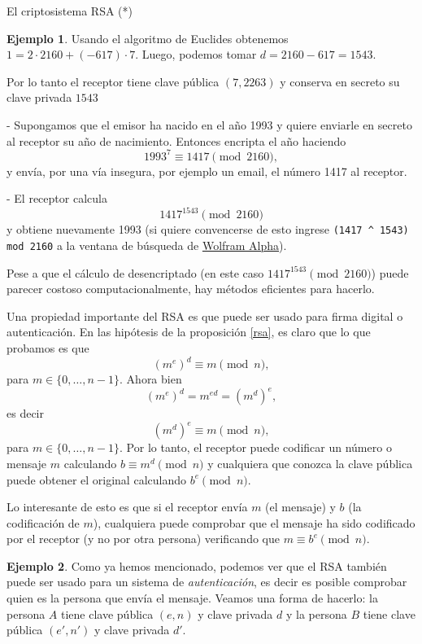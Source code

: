 \documentclass[11pt,spanish,makeidx]{amsbook}
\theoremstyle{definition}
\newtheorem{ejemplo}{Ejemplo}[section]
\theoremstyle{remark}
\begin{document}
\begin{section}{El criptosistema RSA (*)}
\begin{ejemplo}
Usando el algoritmo de Euclides obtenemos $1 = 2\cdot 2160 + (-617)\cdot 7$. Luego, podemos tomar $d = 2160 -617 =1543$. 

Por lo tanto el receptor tiene clave pública $(7,2263)$ y conserva en secreto  su clave privada $1543$

- Supongamos que el emisor ha nacido en el año 1993 y quiere enviarle en secreto al receptor su año de nacimiento. Entonces encripta el año haciendo 
$$
1993^7 \equiv 1417 \pmod{2160},
$$   
y envía, por una vía insegura, por ejemplo un email, el número 1417 al receptor.

- El receptor calcula
$$
1417^{1543} \pmod{2160}
$$ 
y obtiene nuevamente 1993 (si quiere convencerse de esto ingrese {\tt (1417 \^{} 1543) mod 2160} a la ventana de búsqueda de \href{https://www.wolframalpha.com}{Wolfram Alpha}).

Pese a que el cálculo de desencriptado (en este caso $1417^{1543} \pmod{2160}$) puede parecer costoso computacionalmente, hay métodos eficientes para hacerlo. 

\end{ejemplo}

Una propiedad importante del RSA es que puede ser usado para firma digital o autenticación. En las hipótesis de la proposición \ref{rsa}, es claro que lo que probamos es que 
$$
(m^e)^d \equiv m \pmod{n},
$$
para $m \in \{0,\ldots,n-1\}$. Ahora bien 
$$
(m^e)^d  = m^{ed} = (m^d)^e,  
$$
es decir
$$
(m^d)^e \equiv m \pmod{n}, 
$$
para $m \in \{0,\ldots,n-1\}$. Por lo tanto, el receptor puede codificar un número o mensaje $m$ calculando  $b \equiv m^d  \pmod{n}$ y cualquiera que conozca la clave pública puede obtener el original calculando $b^e \pmod{n}$. 

Lo interesante de esto es que si el receptor envía $m$ (el mensaje) y $b$ (la codificación de $m$), cualquiera puede comprobar que el mensaje ha sido codificado por el receptor (y no por otra persona) verificando  que   $m \equiv b^e \pmod{n}$.     

\begin{ejemplo}
Como ya hemos mencionado, podemos ver que el RSA también puede ser usado para un sistema de \emph{autenticación}, es decir es posible comprobar quien es la persona que envía el mensaje. Veamos una forma de hacerlo: la persona $A$ tiene clave pública $(e,n)$ y clave privada $d$ y   la persona $B$  tiene clave pública $(e',n')$ y clave privada $d'$. 


\end{ejemplo}
\end{section}
\end{document}
